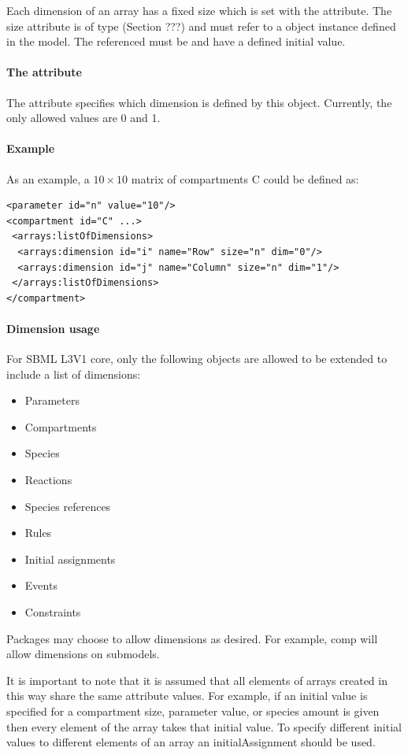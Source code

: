 Each dimension of an array has a fixed size which is set with the  attribute.  The size attribute is of type  (Section ???) and must refer to a \Parameter object instance defined in the model.  The \Parameter referenced must be  and have a defined initial value.

\paragraph{The  attribute}

The  attribute specifies which dimension is defined by this \Dimension object.  Currently, the only allowed values are 0 and 1.

\paragraph{Example}

As an example, a $10 \times 10$ matrix of compartments C could be defined as:
\begin{verbatim} 
<parameter id="n" value="10"/>
<compartment id="C" ...>
 <arrays:listOfDimensions>
  <arrays:dimension id="i" name="Row" size="n" dim="0"/>
  <arrays:dimension id="j" name="Column" size="n" dim="1"/>
 </arrays:listOfDimensions>
</compartment>
\end{verbatim}

\paragraph{Dimension usage}

For SBML L3V1 core, only the following objects are allowed to be extended to include a list of dimensions:
\begin{itemize}
\item Parameters
\item Compartments
\item Species
\item Reactions
\item Species references
\item Rules
\item Initial assignments
\item Events
\item Constraints
\end{itemize}
Packages may choose to allow dimensions as desired.  For example, comp will allow dimensions on submodels.  

It is important to note that it is assumed that all elements of arrays created in this way share the same attribute values.  For example, if an initial value is specified for a compartment size, parameter value, or species amount is given then every element of the array takes that initial value.  To specify different initial values to different elements of an array an initialAssignment should be used. 

